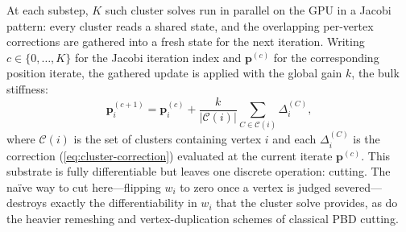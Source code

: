 At each substep, $K$ such cluster solves run in parallel on the GPU in
a Jacobi pattern: every cluster reads a shared state, and the
overlapping per-vertex corrections are gathered into a fresh state for
the next iteration. Writing $c\in\{0,\dots,K\}$ for the Jacobi
iteration index and $\mathbf{p}^{(c)}$ for the corresponding position
iterate, the gathered update is applied with the global gain $k$, the
bulk stiffness:
\begin{equation}
  \mathbf{p}^{(c+1)}_i = \mathbf{p}^{(c)}_i +
    \frac{k}{|\mathcal{C}(i)|}\!\sum_{C \in \mathcal{C}(i)}
    \Delta_i^{(C)},
  \label{eq:apply}
\end{equation}
where $\mathcal{C}(i)$ is the set of clusters containing vertex $i$ and
each $\Delta_i^{(C)}$ is the correction (\ref{eq:cluster-correction})
evaluated at the current iterate $\mathbf{p}^{(c)}$. This substrate is
fully differentiable but leaves one discrete operation: cutting. The
naïve way to cut here---flipping $w_i$ to zero once a vertex is judged
severed---destroys exactly the differentiability in $w_i$ that the
cluster solve provides, as do the heavier remeshing and
vertex-duplication schemes of classical PBD cutting. 
